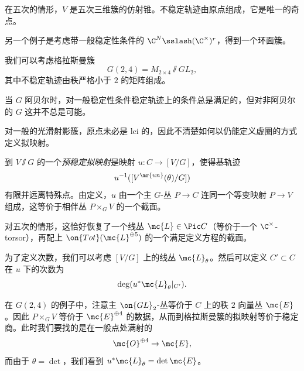 \begin{exm}
    在五次的情形，\(V\) 是五次三维簇的仿射锥。不稳定轨迹由原点组成，它是唯一的奇点。
\end{exm}

\begin{exm}
    另一个例子是考虑带一般稳定性条件的 \(\C^N \sslash (\C^{\times})^r\)，得到一个环面簇。
\end{exm}

\begin{exm}
    我们可以考虑格拉斯曼簇
    \[ G(2,4) = M_{2\times 4} \sslash GL_2, \]
    其中不稳定轨迹由秩严格小于 \(2\) 的矩阵组成。
\end{exm}

\begin{rmk}
    当 \(G\) 阿贝尔时，对一般稳定性条件稳定轨迹上的条件总是满足的，但对非阿贝尔的 \(G\) 这并不总是可能。
\end{rmk}

\begin{rmk}
    对一般的光滑射影簇，原点未必是 lci 的，因此不清楚如何以仍能定义虚圈的方式定义拟映射。
\end{rmk}

\begin{defn}
    到 \(V \sslash G\) 的一个\textit{预稳定拟映射}是映射 \(u \colon C \to [V/G]\)，使得基轨迹
    \[ u^{-1}([V^{\mr{un}}(\theta) / G]) \]
    有限并远离特殊点。由定义，\(u\) 由一个主 \(G\)-丛 \(P \to C\) 连同一个等变映射 \(P \to V\) 组成，这等价于相伴丛 \(P \times_G V\) 的一个截面。
\end{defn}

\begin{exm}
    对五次的情形，这恰好恢复了一个线丛 \(\mc{L} \in \Pic C\)（等价于一个 \(\C^{\times}\)-torsor），再配上 \(\on{Tot}(\mc{L}^{\oplus 5})\) 的一个满足定义方程的截面。
\end{exm}

为了定义次数，我们可以考虑 \([V/G]\) 上的线丛 \(\mc{L}_{\theta}\)。然后可以定义 \(C' \subset C\) 在 \(u\) 下的次数为
\[ \deg (u^* \mc{L}_{\theta}|_{C'}). \]

\begin{exm}
    在 \(G(2,4)\) 的例子中，注意主 \(\on{GL}_2\)-丛等价于 \(C\) 上的秩 \(2\) 向量丛 \(\mc{E}\)。因此 \(P \times_G V\) 等价于 \(\mc{E}^{\oplus 4}\) 的数据，从而到格拉斯曼簇的拟映射等价于稳定商。此时我们要找的是在一般点处满射的
    \[ \mc{O}^{\oplus 4} \to \mc{E}, \]
    而由于 \(\theta = \det\)，我们看到 \(u^* \mc{L}_{\theta} = \det \mc{E}\)。
\end{exm}


